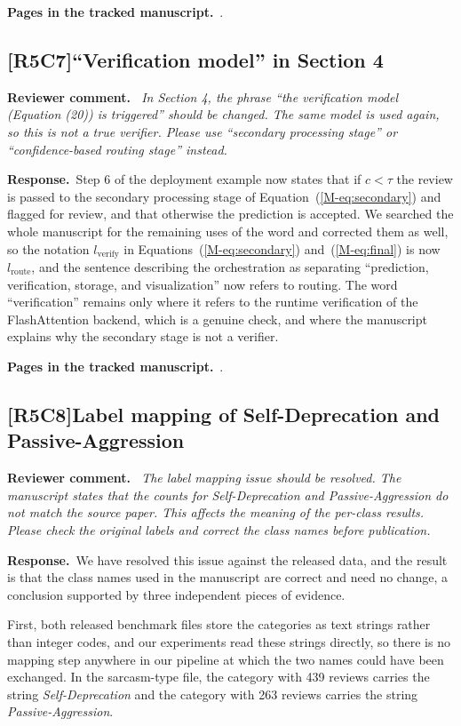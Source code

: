 \documentclass[11pt,a4paper]{article}
\newcommand{\meq}[1]{Equation~(\ref{M-#1})}
\newcommand{\comment}[3]{\subsection*{\textcolor{#1}{[#2]}\enspace #3}}
\newenvironment{reviewercomment}{\par\noindent\textbf{Reviewer comment.}\itshape\ }{\par}
\newcommand{\response}{\par\noindent\textbf{Response.}\ }
\newcommand{\where}[1]{\par\noindent\textbf{Pages in the tracked manuscript.}\ \rvpages[M-]{#1}.}
\begin{document}
\where{R5C6}

\comment{rvFive}{R5C7}{``Verification model'' in Section 4}
\begin{reviewercomment}
In Section 4, the phrase ``the verification model (Equation (20)) is triggered'' should be changed. The same model is used again, so this is not a true verifier. Please use ``secondary processing stage'' or ``confidence-based routing stage'' instead.
\end{reviewercomment}
\response Step 6 of the deployment example now states that if $c < \tau$ the review is passed to the secondary processing stage of \meq{eq:secondary} and flagged for review, and that otherwise the prediction is accepted. We searched the whole manuscript for the remaining uses of the word and corrected them as well, so the notation $l_{\mathrm{verify}}$ in Equations~(\ref{M-eq:secondary}) and~(\ref{M-eq:final}) is now $l_{\mathrm{route}}$, and the sentence describing the orchestration as separating ``prediction, verification, storage, and visualization'' now refers to routing. The word ``verification'' remains only where it refers to the runtime verification of the FlashAttention backend, which is a genuine check, and where the manuscript explains why the secondary stage is not a verifier.

\where{R5C7}

\comment{rvBoth}{R5C8}{Label mapping of Self-Deprecation and Passive-Aggression}
\begin{reviewercomment}
The label mapping issue should be resolved. The manuscript states that the counts for Self-Deprecation and Passive-Aggression do not match the source paper. This affects the meaning of the per-class results. Please check the original labels and correct the class names before publication.
\end{reviewercomment}
\response We have resolved this issue against the released data, and the result is that the class names used in the manuscript are correct and need no change, a conclusion supported by three independent pieces of evidence.

First, both released benchmark files store the categories as text strings rather than integer codes, and our experiments read these strings directly, so there is no mapping step anywhere in our pipeline at which the two names could have been exchanged. In the sarcasm-type file, the category with 439 reviews carries the string \textit{Self-Deprecation} and the category with 263 reviews carries the string \textit{Passive-Aggression}.
\end{document}
